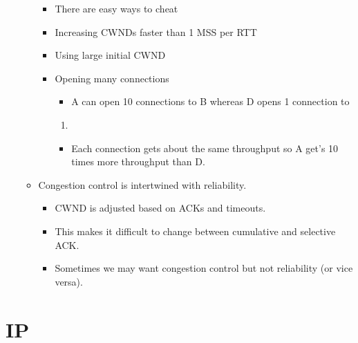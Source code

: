 \documentclass[]{article}
\providecommand{\tightlist}{%
  \setlength{\itemsep}{0pt}\setlength{\parskip}{0pt}}
\begin{document}
\begin{itemize}
\begin{itemize}
    \begin{itemize}
    \tightlist
    \item
      There are easy ways to cheat
    \item
      Increasing CWNDs faster than 1 MSS per RTT
    \item
      Using large initial CWND
    \item
      Opening many connections

      \begin{itemize}
      \tightlist
      \item
        A can open 10 connections to B whereas D opens 1 connection to
      \end{itemize}

      \begin{enumerate}
      \def\labelenumi{\Alph{enumi}.}
      \setcounter{enumi}{3}
      \item
      \end{enumerate}

      \begin{itemize}
      \tightlist
      \item
        Each connection gets about the same throughput so A get's 10
        times more throughput than D.
      \end{itemize}
    \end{itemize}
  \item
    Congestion control is intertwined with reliability.

    \begin{itemize}
    \tightlist
    \item
      CWND is adjusted based on ACKs and timeouts.
    \item
      This makes it difficult to change between cumulative and selective
      ACK.
    \item
      Sometimes we may want congestion control but not reliability (or
      vice versa).
    \end{itemize}
  \end{itemize}
\end{itemize}

\hypertarget{ip}{%
\section{IP}\label{ip}}
\end{document}
